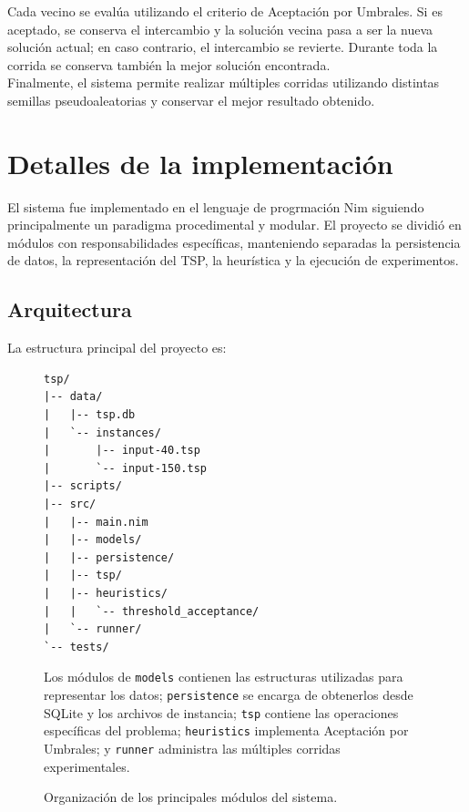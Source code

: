 \documentclass[twoside,11pt]{article}
\begin{document}
Cada vecino se evalúa utilizando el criterio de Aceptación por Umbrales. Si es aceptado, se conserva el intercambio y la solución vecina pasa a ser la nueva
solución actual; en caso contrario, el intercambio se revierte. Durante toda la corrida se conserva también la mejor solución encontrada.\\

Finalmente, el sistema permite realizar múltiples corridas utilizando distintas semillas pseudoaleatorias y conservar el mejor resultado obtenido.

\section{Detalles de la implementación}

El sistema fue implementado en el lenguaje de progrmación Nim siguiendo principalmente un paradigma procedimental y modular. El proyecto se dividió en módulos con responsabilidades específicas, manteniendo separadas la persistencia de datos, la representación
del TSP, la heurística y la ejecución de experimentos.

\subsection{Arquitectura}

La estructura principal del proyecto es:

\begin{figure}[H]
\centering

\begin{minipage}[t]{0.47\textwidth}
\begin{verbatim}
tsp/
|-- data/
|   |-- tsp.db
|   `-- instances/
|       |-- input-40.tsp
|       `-- input-150.tsp
|-- scripts/
|-- src/
|   |-- main.nim
|   |-- models/
|   |-- persistence/
|   |-- tsp/
|   |-- heuristics/
|   |   `-- threshold_acceptance/
|   `-- runner/
`-- tests/
\end{verbatim}
\end{minipage}
\hfill
\begin{minipage}[t]{0.47\textwidth}
\small
Los módulos de \texttt{models} contienen las estructuras utilizadas para representar los datos; \texttt{persistence} se encarga de obtenerlos desde SQLite y los archivos de instancia; \texttt{tsp} contiene las operaciones específicas del problema; \texttt{heuristics} implementa Aceptación por Umbrales; y \texttt{runner} administra las múltiples corridas experimentales.
\end{minipage}
\caption{Organización de los principales módulos del sistema.}
\label{fig:project-structure}
\end{figure}
\end{document}
